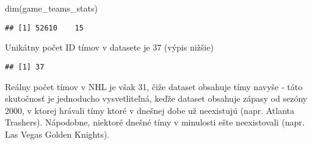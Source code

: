 \documentclass[
]{article}
\newenvironment{Shaded}{\begin{snugshade}}{\end{snugshade}}
\newcommand{\FunctionTok}[1]{\textcolor[rgb]{0.00,0.00,0.00}{#1}}
\newcommand{\NormalTok}[1]{#1}
\newcommand{\OtherTok}[1]{\textcolor[rgb]{0.56,0.35,0.01}{#1}}
\newcommand{\SpecialCharTok}[1]{\textcolor[rgb]{0.00,0.00,0.00}{#1}}
\newcommand{\StringTok}[1]{\textcolor[rgb]{0.31,0.60,0.02}{#1}}
\begin{document}
\begin{Shaded}
\begin{Highlighting}[]
\FunctionTok{dim}\NormalTok{(game\_teams\_stats)}
\end{Highlighting}
\end{Shaded}

\begin{verbatim}
## [1] 52610    15
\end{verbatim}

Unikátny počet ID tímov v datasete je 37 (výpis nižšie)

\begin{Shaded}
\end{Shaded}

\begin{verbatim}
## [1] 37
\end{verbatim}

Reálny počet tímov v NHL je však 31, čiže dataset obsahuje tímy navyše -
táto skutočnosť je jednoducho vysvetliteľná, keďže dataset obsahuje
zápasy od sezóny 2000, v ktorej hrávali tímy ktoré v dnešnej dobe už
neexistujú (napr. Atlanta Trashers). Nápodobne, niektoré dnešné tímy v
minulosti ešte neexistovali (napr. Las Vegas Golden Knights).

\begin{Shaded}
\end{Shaded}
\end{document}
